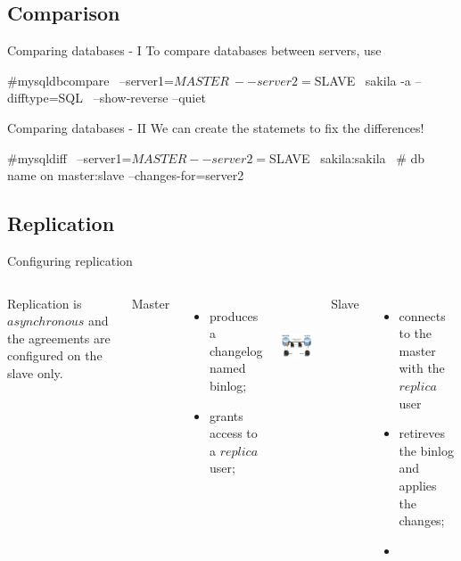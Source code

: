 \documentclass{beamer}[10]
\begin{document}
%
%
\subsection{Comparison}
\begin{pyframe}{Comparing databases - I}
To compare databases between servers, use
\begin{bashcode}
#mysqldbcompare \
    --server1=$MASTER \
    --server2=$SLAVE \
    sakila -a --difftype=SQL \
    --show-reverse --quiet
\end{bashcode}

\end{pyframe}


\begin{pyframe}{Comparing databases - II}
We can create the statemets to fix the differences!
\begin{bashcode}
#mysqldiff \
    --server1=$MASTER --server2=$SLAVE \
    sakila:sakila \ # db name on master:slave
    --changes-for=server2
\end{bashcode}
\end{pyframe}


%
%
\subsection{Replication}
\begin{pyframe}{Configuring replication}
\begin{columns}
Replication is $asynchronous$ and the agreements are configured on the slave only.

    {\large Master}
    \begin{itemize}
    \item produces a changelog named binlog;
    \item grants access to a $replica$ user;
    \end{itemize}
\includegraphics[height=3cm]{images/mysql-replica-hla.jpg}

    {\large Slave}
    \begin{itemize}
    \item connects to the master with the $replica$ user
    \item retireves the binlog and applies the changes;
    \item \code{START SLAVE;}
    \end{itemize}
\end{columns}
\end{pyframe}
\end{document}
